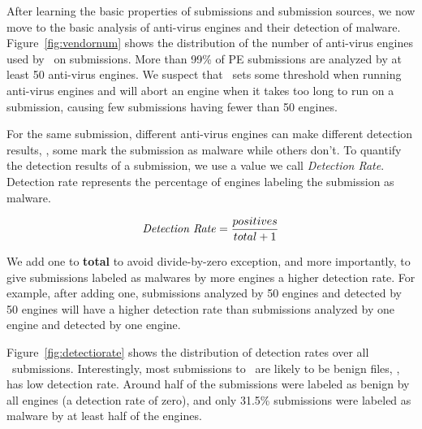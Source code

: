 

After learning the basic properties of submissions and submission sources, 
we now move to the basic analysis of anti-virus engines and their detection of malware.
Figure~\ref{fig:vendornum} shows the distribution of the number of anti-virus engines used by \vt\ on submissions. 
More than 99\% of PE submissions are analyzed by at least 50 anti-virus engines. 
We suspect that \vt\ sets some threshold when running anti-virus engines and 
will abort an engine when it takes too long to run on a submission,
causing few submissions having fewer than 50 engines.

For the same submission, different anti-virus engines can make different detection results, \ie, some mark the submission as malware while others don't.
To quantify the detection results of a submission,
we use a value we call {\em Detection Rate}.
Detection rate represents the percentage of engines labeling the submission as malware. 

$$ \textrm{\textit{Detection Rate}} = \dfrac{positives}{total + 1}$$

We add one to {\bf total} to avoid divide-by-zero exception, and more importantly, 
to give submissions labeled as malwares by more engines a higher detection rate. 
For example, after adding one, submissions analyzed by 50 engines and detected by 50 engines will have a higher detection rate 
than submissions analyzed by one engine and detected by one engine. 

Figure~\ref{fig:detectiorate} shows the distribution of detection rates over all \pe\ submissions.
Interestingly, most submissions to \vt\ are likely to be benign files, \ie, has low detection rate.
Around half of the submissions were labeled as benign by all engines (a detection rate of zero),
and only 31.5\% submissions were labeled as malware by at least half of the engines.

